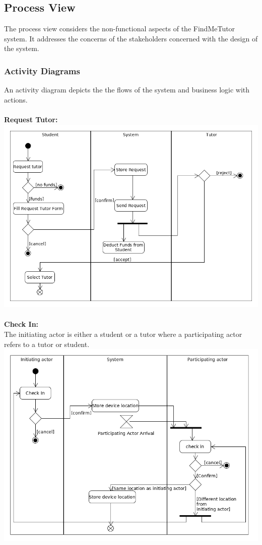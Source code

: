 \documentclass[12pt]{article}
\begin{document}
\subsection{Process View}
The process view considers the non-functional aspects of the FindMeTutor system. It addresses the concerns of the stakeholders concerned with the design of the system.

\subsubsection{Activity Diagrams}
An activity diagram depicts the the flows of the system and business logic with actions.\\
\\\textbf{Request Tutor:}\\
\includegraphics[width=140mm]{./activity_diagram/request_tutor.png}
\pagebreak
\\\\\textbf{Check In:}\\
The initiating actor is either a student or a tutor where a participating actor refers to a tutor or student.\\
\includegraphics[width=140mm]{./activity_diagram/checked_in.png}
\end{document}
